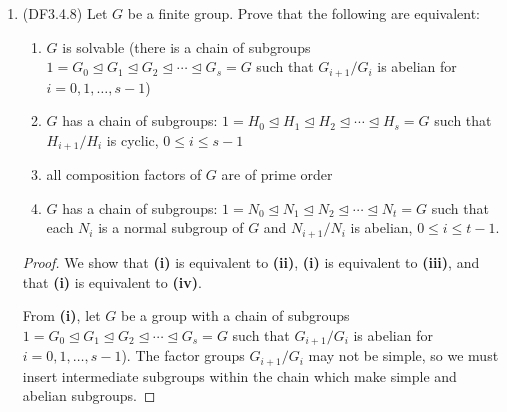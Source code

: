 \documentclass[11pt]{article}
\newcommand{\cbr}[1]{\left\{#1\right\}}
\begin{document}
\begin{enumerate}
\begin{proof}
      Then suppose that $G$ is an infinite cyclic group. Then $\abr{x} = \cbr{x,x^2,\dots} = G$ but since $x^2\neq 1$ (infinite order), $\abr{x^2} = \cbr{x^2,x^4,\dots}\neq G$ but $\abr{x^2}$ is normal in $G$ because $G$ is abelian. This is in contradiction to the assumption that $G$ was simple. So $G$ has finite order.
      
      Suppose that the order of $G$ is composite. Then $\abs{G} = pk$ for some prime $p$ and some positive integer $k>1$ ($\abs{G}$ is composite). But by Cauchy's theorem, we know that there is a subgroup of $G$ of order $p$, which is strictly less than $\abs{G}$ and strictly greater than $1$, which again is in contradiction to the assumption that $G$ was simple. Hence the order of $G$ is not composite; that is, the order of $G$ is a prime number.

      Groups with prime order are known to be cyclic due to Lagrange's theorem. Therefore $G\cong Z_p$ for some prime $p$.
    \end{proof}
    \item (DF3.4.8) Let $G$ be a finite group. Prove that the following are equivalent:
    \begin{enumerate}[label=\textbf{(\roman*)}]
      \item $G$ is solvable (there is a chain of subgroups $1 = G_0 \unlhd G_1 \unlhd G_2 \unlhd \cdots \unlhd G_s = G$ such that $G_{i+1}/G_i$ is abelian for $i = 0,1,\dots,s-1$)
      \item $G$ has a chain of subgroups: $1 = H_0 \unlhd H_1 \unlhd H_2 \unlhd \cdots \unlhd H_s = G$ such that $H_{i+1}/H_i$ is cyclic, $0\leq i\leq s-1$
      \item all composition factors of $G$ are of prime order
      \item $G$ has a chain of subgroups: $1 = N_0 \unlhd N_1 \unlhd N_2 \unlhd \cdots \unlhd N_t = G$ such that each $N_i$ is a normal subgroup of $G$ and $N_{i+1}/N_i$ is abelian, $0\leq i\leq t-1$.
    \end{enumerate}
    \begin{proof}
      We show that \textbf{(i)} is equivalent to \textbf{(ii)}, \textbf{(i)} is equivalent to \textbf{(iii)}, and that \textbf{(i)} is equivalent to \textbf{(iv)}.

      From \textbf{(i)}, let $G$ be a group with a chain of subgroups $1 = G_0 \unlhd G_1 \unlhd G_2 \unlhd \cdots \unlhd G_s = G$ such that $G_{i+1}/G_i$ is abelian for $i = 0,1,\dots,s-1$). The factor groups $G_{i+1}/G_i$ may not be simple, so we must insert intermediate subgroups within the chain which make simple and abelian subgroups.


\end{proof}
\end{enumerate}
\end{document}
